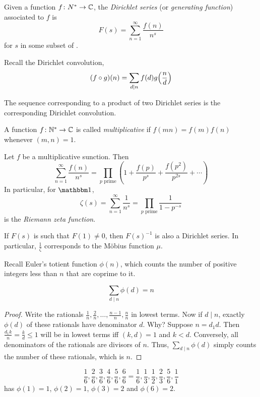 \begin{definition*} \label{def:dirichlet_series}
    Given a function $f\colon N^* \to \mathbb{C}$, the \emph{Dirichlet series}
    (or \emph{generating function}) associated to $f$ is \[
        F(s) = \sum_{n=1}^\infty \frac{f(n)}{n^s}
    \] for $s$ in some subset of \C.
\end{definition*}
Recall the Dirichlet convolution, \[
    (f \circ g)(n) = \sum_{d \mid n} f(d)g\paren*[\Big]{\frac{n}{d}}
\]
\begin{exercise}
    The sequence corresponding to a product of two Dirichlet series is the
    corresponding Dirichlet convolution.
\end{exercise}

\begin{definition*}[Multiplicative] \label{def:multiplicative}
    A function $f\colon \mathbb{N}^* \to \mathbb{C}$ is called \emph{multiplicative} if
    $f(mn) = f(m)f(n)$ whenever $(m, n) = 1$.
\end{definition*}
\begin{fact}
    Let $f$ be a multiplicative sunction.
    Then \[
        \sum_{n=1}^\infty \frac{f(n)}{n^s}
        = \prod_{p \text{ prime}} \left(1 + \frac{f(p)}{p^s} + \frac{f(p^2)}{p^{2s}} + \cdots\right)
    \] In particular, for $\mathbbm 1$, \[
        \zeta(s) = \sum_{n=1}^\infty \frac{1}{n^s}
        = \prod_{p \text{ prime}} \frac{1}{1 - p^{-s}}
    \] is the \emph{Riemann zeta function}.
\end{fact}

If $F(s)$ is such that $F(1) \ne 0$, then $F(s)^{-1}$ is also a Dirichlet
series.
In particular, $\frac1{\zeta}$ corresponds to the Möbius function $\mu$.

Recall Euler's totient function $\phi(n)$, which counts the number of
positive integers less than $n$ that are coprime to it.
\begin{proposition*} \label{thm:totient:sum}
    \[
        \sum_{d \mid n} \phi(d) = n
    \]
\end{proposition*}
\begin{proof}
    Write the rationals $\frac1n, \frac{2}{n}, \dots,
    \frac{n-1}{n}, \frac{n}{n}$ in lowest terms.
    Now if $d \mid n$, exactly $\phi(d)$ of these rationals have
    denominator $d$.
    Why? Suppose $n = d_1 d$.
    Then $\frac{d_1 k}{n} = \frac{k}{d} \le 1$ will be in lowest terms iff
    $(k, d) = 1$ and $k < d$.
    Conversely, all denominators of the rationals are divisors of $n$.
    Thus, $\sum_{d \mid n} \phi(d)$ simply counts the number of these
    rationals, which is $n$.
\end{proof}
\begin{example}
    \[
        \frac16, \frac26, \frac36, \frac46, \frac56, \frac66
        = \frac16, \frac13, \frac12, \frac23, \frac56, \frac11
    \] has $\phi(1) = 1$, $\phi(2) = 1$, $\phi(3) = 2$ and $\phi(6) = 2$.
\end{example}

